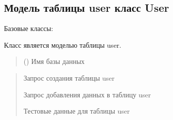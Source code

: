 \documentclass[letterpaper,10pt,russian]{sphinxmanual}
\begin{document}
\subsection{Модель таблицы user \sphinxhyphen{} класс User}
\label{\detokenize{database.sqlite3_interface.tables:module-database.sqlite3_interface.tables.user}}\label{\detokenize{database.sqlite3_interface.tables:user-user}}

\begin{fulllineitems}
\label{\detokenize{database.sqlite3_interface.tables:database.sqlite3_interface.tables.user.User}}
\pysigstartsignatures
{}
\pysigstopsignatures
\sphinxAtStartPar
Базовые классы: {\hyperref[\detokenize{database.sqlite3_interface.tables:database.sqlite3_interface.tables.table.Table}]{}}

\sphinxAtStartPar
Класс является моделью таблицы user.
\begin{quote}\begin{description}
\sphinxAtStartPar
{} () \textendash{} Имя базы данных

\end{description}\end{quote}
\begin{description}
\begin{quote}\begin{description}
\sphinxAtStartPar
Запрос создания таблицы user

\sphinxAtStartPar
Запрос добавления данных в таблицу user

\sphinxAtStartPar
Тестовые данные для таблицы user


\end{description}
\end{quote}
\end{description}
\end{fulllineitems}
\end{document}
